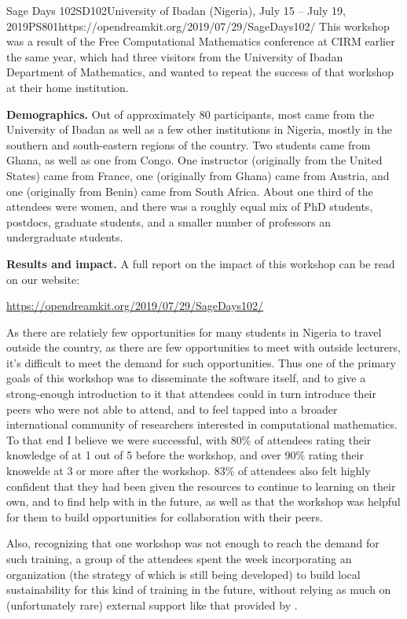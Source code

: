\begin{event}{Sage Days 102}{SD102}{University of Ibadan (Nigeria), July 15 -- July 19, 2019}{PS}{80}{1}{https://opendreamkit.org/2019/07/29/SageDays102/}
This workshop was a result of the Free Computational Mathematics conference at
CIRM earlier the same year, which had three visitors from the University
of Ibadan Department of Mathematics, and wanted to repeat the success of
that workshop at their home institution.


\textbf{Demographics.} Out of approximately 80 participants, most came from the
University of Ibadan as well as a few other institutions in Nigeria,
mostly in the southern and south-eastern regions of the country.  Two
students came from Ghana, as well as one from Congo.  One instructor
(originally from the United States) came from France, one (originally
from Ghana) came from Austria, and one (originally from Benin) came
from South Africa.  About one third of the attendees were women, and
there was a roughly equal mix of PhD students, postdocs, graduate
students, and a smaller number of professors an undergraduate students.

\textbf{Results and impact.} A full report on the impact of this
workshop can be read on our website:
\centerline{\url{https://opendreamkit.org/2019/07/29/SageDays102/}}

As there are relatiely few opportunities for many students in Nigeria to travel
outside the country, as there are few opportunities to meet with
outside lecturers, it's difficult to meet the demand for such
opportunities. Thus one of the primary goals of this workshop was to
disseminate the software itself, and to give a strong-enough
introduction to it that attendees could in turn introduce their peers
who were not able to attend, and to feel tapped into a broader
international community of researchers interested in computational
mathematics. To that end I believe we were successful, with 80\% of
attendees rating their knowledge of \Sage at 1 out of 5 before the
workshop, and over 90\% rating their knowelde at 3 or more after the
workshop.  83\% of attendees also felt highly confident that they had
been given the resources to continue to learning on their own, and to
find help with \Sage in the future, as well as that the workshop was
helpful for them to build opportunities for collaboration with their
peers.

Also, recognizing that one workshop was not enough to reach the demand for such
training, a group of the attendees spent the week incorporating an
organization (the strategy of which is still being developed) to build
local sustainability for this kind of training in the future, without
relying as much on (unfortunately rare) external support like that provided
by \ODK.


\end{event}
